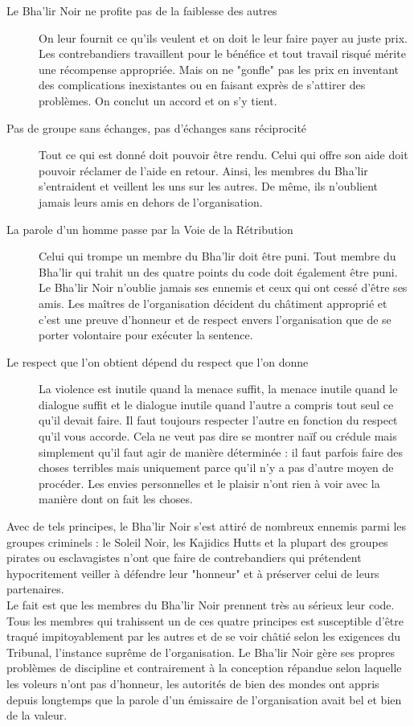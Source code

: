 \documentclass[twoside]{article}
\begin{document}
\begin{description}
	\item[Le Bha'lir Noir ne profite pas de la faiblesse des autres] On leur fournit ce qu'ils veulent et on doit le leur faire payer au juste prix. Les contrebandiers travaillent pour le bénéfice et tout travail risqué mérite une récompense appropriée. Mais on ne "gonfle" pas les prix en inventant des complications inexistantes ou en faisant exprès de s'attirer des problèmes. On conclut un accord et on s'y tient.
	\item[Pas de groupe sans échanges, pas d'échanges sans réciprocité] Tout ce qui est donné doit pouvoir être rendu. Celui qui offre son aide doit pouvoir réclamer de l'aide en retour. Ainsi, les membres du Bha'lir s'entraident et veillent les uns sur les autres. De même, ils n'oublient jamais leurs amis en dehors de l'organisation.
	\item[La parole d'un homme passe par la Voie de la Rétribution] Celui qui trompe un membre du Bha'lir doit être puni. Tout membre du Bha'lir qui trahit un des quatre points du code doit également être puni. Le Bha'lir Noir n'oublie jamais ses ennemis et ceux qui ont cessé d'être ses amis. Les ma\^{i}tres de l'organisation décident du châtiment approprié et c'est une preuve d'honneur et de respect envers l'organisation que de se porter volontaire pour exécuter la sentence.
	\item[Le respect que l'on obtient dépend du respect que l'on donne] La violence est inutile quand la menace suffit, la menace inutile quand le dialogue suffit et le dialogue inutile quand l'autre a compris tout seul ce qu'il devait faire. Il faut toujours respecter l'autre en fonction du respect qu'il vous accorde. Cela ne veut pas dire se montrer naïf ou crédule mais simplement qu'il faut agir de manière déterminée : il faut parfois faire des choses terribles mais uniquement parce qu'il n'y a pas d'autre moyen de procéder. Les envies personnelles et le plaisir n'ont rien à voir avec la manière dont on fait les choses.
\end{description}


Avec de tels principes, le Bha'lir Noir s'est attiré de nombreux ennemis parmi les groupes criminels : le Soleil Noir, les Kajidics Hutts et la plupart des groupes pirates ou esclavagistes n'ont que faire de contrebandiers qui prétendent hypocritement veiller à défendre leur "honneur" et à préserver celui de leurs partenaires.\\

Le fait est que les membres du Bha'lir Noir prennent très au sérieux leur code. Tous les membres qui trahissent un de ces quatre principes est susceptible d'être traqué impitoyablement par les autres et de se voir châtié selon les exigences du Tribunal, l'instance suprême de l'organisation. Le Bha'lir Noir gère ses propres problèmes de discipline et contrairement à la conception répandue selon laquelle les voleurs n'ont pas d'honneur, les autorités de bien des mondes ont appris depuis longtemps que la parole d'un émissaire de l'organisation avait bel et bien de la valeur.\\
\end{document}
